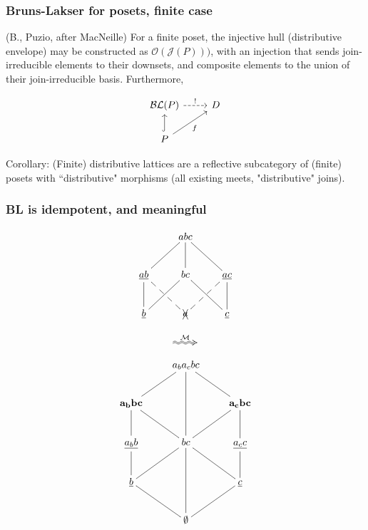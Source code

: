 \documentclass{beamer}
\newcommand{\Mcc}{\mathcal{M}}
\newcommand{\Oc}{\mathcal{O}}
\newcommand{\Jc}{\mathcal{J}}
\newcommand{\BLc}{\mathcal{BL}}
\begin{document}
\begin{frame}[fragile]
\frametitle{Bruns-Lakser for posets, finite case}

\begin{theorem}
(B., Puzio, after MacNeille) For a finite poset, the injective hull (distributive envelope) may be constructed as \(\Oc(\Jc(P)))\), with an injection that sends join-irreducible elements to their downsets, and composite elements to the union of their join-irreducible basis. Furthermore,

\begin{equation*}
\begin{tikzcd}
\BLc(P) \arrow[r, "!",dashed]            & D \\
P \arrow[u, hook] \arrow[ru, "f"'] &
\end{tikzcd}
\end{equation*}

\end{theorem}

Corollary: (Finite) distributive lattices are a reflective subcategory of (finite) posets with ``distributive" morphisms (all existing meets, "distributive" joins).
\end{frame}

\begin{frame}
\frametitle{BL is idempotent, and meaningful}
\begin{figure}
\begin{minipage}[c]{0.4\textwidth}
\begin{equation*}
    \xymatrix{& abc \ar@{-}[dl] \ar@{-}[d] \ar@{-}[dr] & \\
      \underline{ab} \ar@{-}[d] \ar@{--}[dr] & bc \ar@{-}[dl] \ar@{-}[dr] &
        \underline{ac} \ar@{-}[d] \ar@{--}[dl] \\
        \underline{b} & \xcancel{a}  & \underline{c} }
\end{equation*}
\end{minipage}
\begin{minipage}[c]{0.08\textwidth}
  \begin{equation*}
    \xymatrix{\ar@2{~>}[r]^{\Mcc} &}
  \end{equation*}
\end{minipage}
\begin{minipage}[c]{0.4\textwidth}
\begin{equation*}
    \xymatrix{& a_ba_cbc \ar@{-}[dl] \ar@{-}[dd] \ar@{-}[dr] & \\
      \mathbf{a_bbc} \ar@{-}[d] \ar@{-}[dr] & &
        \mathbf{a_cbc} \ar@{-}[d] \ar@{-}[dl]\\
        \underline{a_bb} \ar@{-}[d] & bc \ar@{-}[dl] \ar@{-}[dd] \ar@{-}[dr] &
          \underline{a_cc} \ar@{-}[d] \\
         \underline{b} \ar@{-}[dr] & & \underline{c} \ar@{-}[dl] \\
      & \mathbf{\emptyset} }
\end{equation*}
\end{minipage}
\end{figure}
\end{frame}
\end{document}
